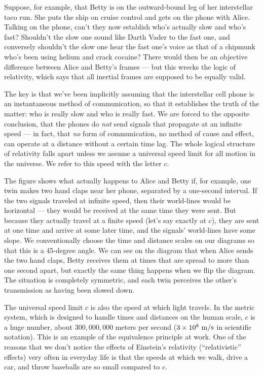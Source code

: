Suppose, for example, that Betty is on the outward-bound leg of her interstellar taco run. She puts the
ship on cruise control and gets on the phone with Alice. Talking on the phone, can't they now establish
who's actually slow and who's fast? Shouldn't the slow one sound like Darth Vader to the fast one,
and conversely shouldn't the slow one hear the fast one's voice as that of a chipmunk who's been
using helium and crack cocaine? There would then be an objective
difference between Alice and Betty's frames --- but this wrecks the logic of relativity, which
says that all inertial frames are supposed to be equally valid.

The key is that we've been implicitly assuming
that the interstellar cell phone is an instantaneous method of communication, so that it establishes
the truth of the matter: who is really slow and who is really fast. We are forced to the
opposite conclusion, that the phones do \emph{not} send signals that propagate at an infinite speed --- in fact,
that \emph{no} form of communication, no method of cause and effect, can operate at a distance without a
certain time lag. The whole logical structure of relativity falls apart unless we assume 
a universal speed limit for all motion in the universe. We refer to this speed with the letter $c$.

\begin{figure}[h]\label{fig:symmetric-signals}
\end{figure}

The figure shows what actually happens to Alice and Betty if, for example, one twin makes two hand claps
near her phone, separated by a one-second interval. If the two signals traveled at infinite speed, then
their world-lines would be horizontal --- they would be received at the same time they were sent. But because
they actually travel at a finite speed (let's say exactly at $c$),
they are sent at one time and arrive at some later time, and
the signals' world-lines have some slope. We conventionally choose the time and distance scales on our diagrams
so that this is a 45-degree angle. We can see on the diagram that when Alice sends the two hand claps, Betty
receives them at times that are spread to more than one second apart, but exactly the same thing happens when
we flip the diagram. The situation is completely symmetric, and each twin perceives the other's transmission as
having been slowed down.

The universal speed limit $c$ is also the speed at which light travels. In the metric system, which is designed to
handle times and distances on the human scale, $c$ is a huge number, about $300,000,000$ meters per second 
($3\times10^8\ \zu{m}/\zu{s}$ in scientific notation). This is an example of the equivalence principle at
work. One of the reasons that we don't notice the effects of Einstein's relativity (``relativistic'' effects)
very often in everyday life is that the speeds at which we walk, drive a car, and throw baseballs are
so small compared to $c$.

